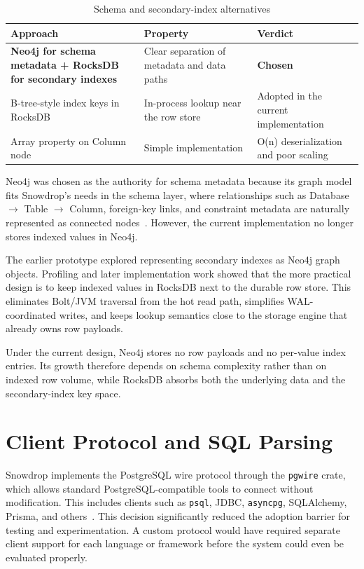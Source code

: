 \begin{table}[H]
\centering
\caption{Schema and secondary-index alternatives}
\label{tab:index-comparison}
\renewcommand{\arraystretch}{1.4}
\begin{tabular}{|l|p{3.5cm}|p{5.5cm}|}
\hline
\textbf{Approach} & \textbf{Property} & \textbf{Verdict} \\
\hline
\textbf{Neo4j for schema metadata + RocksDB for secondary indexes} & Clear separation of metadata and data paths & \textbf{Chosen} \\
\hline
B-tree-style index keys in RocksDB & In-process lookup near the row store & Adopted in the current implementation \\
\hline
Array property on Column node & Simple implementation & O(n) deserialization and poor scaling \\
\hline
\end{tabular}
\end{table}

Neo4j was chosen as the authority for schema metadata because its graph model fits Snowdrop’s needs in the schema layer, where relationships such as Database $\rightarrow$ Table $\rightarrow$ Column, foreign-key links, and constraint metadata are naturally represented as connected nodes~\cite{robinson2015, neo4j2025}. However, the current implementation no longer stores indexed values in Neo4j.

The earlier prototype explored representing secondary indexes as Neo4j graph objects. Profiling and later implementation work showed that the more practical design is to keep indexed values in RocksDB next to the durable row store. This eliminates Bolt/JVM traversal from the hot read path, simplifies WAL-coordinated writes, and keeps lookup semantics close to the storage engine that already owns row payloads.

Under the current design, Neo4j stores no row payloads and no per-value index entries. Its growth therefore depends on schema complexity rather than on indexed row volume, while RocksDB absorbs both the underlying data and the secondary-index key space.

\section{Client Protocol and SQL Parsing}

Snowdrop implements the PostgreSQL wire protocol through the \texttt{pgwire} crate, which allows standard PostgreSQL-compatible tools to connect without modification. This includes clients such as \texttt{psql}, JDBC, \texttt{asyncpg}, SQLAlchemy, Prisma, and others~\cite{postgresql2026}. This decision significantly reduced the adoption barrier for testing and experimentation. A custom protocol would have required separate client support for each language or framework before the system could even be evaluated properly.

